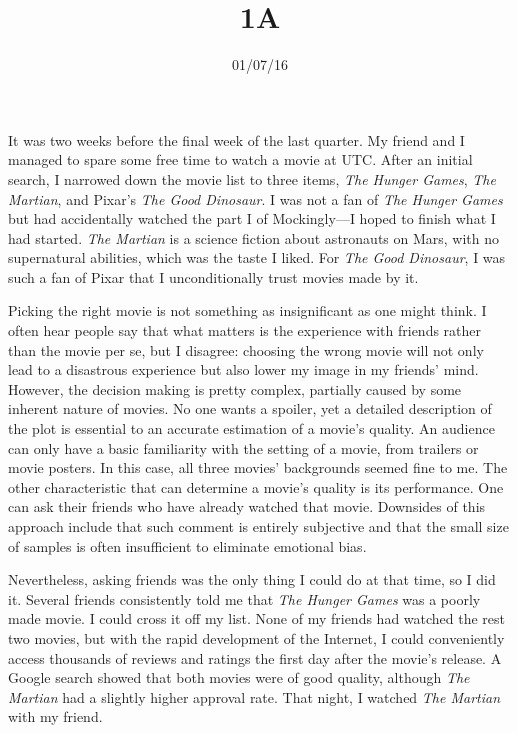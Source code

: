 \documentclass{writing}
\title{1A}
\date{01/07/16}
\begin{document}
\maketitle

It was two weeks before the final week of the last quarter. My friend
and I managed to spare some free time to watch a movie at UTC. After an
initial search, I narrowed down the movie list to three items, \emph{The
Hunger Games}, \emph{The Martian}, and Pixar's \emph{The Good Dinosaur}.
I was not a fan of \emph{The Hunger Games} but had accidentally watched
the part I of Mockingly---I hoped to finish what I had started.
\emph{The Martian} is a science fiction about astronauts on Mars, with
no supernatural abilities, which was the taste I liked. For \emph{The
Good Dinosaur}, I was such a fan of Pixar that I unconditionally trust
movies made by it.

Picking the right movie is not something as insignificant as one might
think. I often hear people say that what matters is the experience with
friends rather than the movie per se, but I disagree: choosing the wrong
movie will not only lead to a disastrous experience but also lower my
image in my friends' mind. However, the decision making is pretty
complex, partially caused by some inherent nature of movies. No one
wants a spoiler, yet a detailed description of the plot is essential to
an accurate estimation of a movie's quality. An audience can only have a
basic familiarity with the setting of a movie, from trailers or movie
posters. In this case, all three movies' backgrounds seemed fine to me.
The other characteristic that can determine a movie's quality is its
performance. One can ask their friends who have already watched that
movie. Downsides of this approach include that such comment is entirely
subjective and that the small size of samples is often insufficient to
eliminate emotional bias.

Nevertheless, asking friends was the only thing I could do at that time,
so I did it. Several friends consistently told me that \emph{The Hunger
Games} was a poorly made movie. I could cross it off my list. None of my
friends had watched the rest two movies, but with the rapid development
of the Internet, I could conveniently access thousands of reviews and
ratings the first day after the movie's release. A Google search showed
that both movies were of good quality, although \emph{The Martian} had a
slightly higher approval rate. That night, I watched \emph{The Martian}
with my friend.
\end{document}
